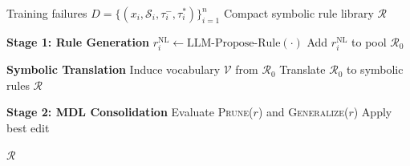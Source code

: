 \begin{algorithm}[h]
\caption{\shortname}
\label{alg:mdlrule}
\small
\begin{algorithmic}[1]
\Require Training failures $D = \{(x_i, \mathcal{S}_i, \tau_i^-, \tau_i^*)\}_{i=1}^n$
\Ensure Compact symbolic rule library $\mathcal{R}$

\Statex \textbf{Stage 1: Rule Generation}
    \State $r_i^{\text{NL}} \gets \text{LLM-Propose-Rule}(\cdot)$
        \State Add $r_i^{\text{NL}}$ to pool $\mathcal{R}_0$
    \EndIf
\EndFor

\Statex \textbf{Symbolic Translation}
\State Induce vocabulary $\mathcal{V}$ from $\mathcal{R}_0$
\State Translate $\mathcal{R}_0$ to symbolic rules $\mathcal{R}$

\Statex \textbf{Stage 2: MDL Consolidation}
\Repeat
        \State Evaluate \textsc{Prune}($r$) and \textsc{Generalize}($r$)
            \State Apply best edit
        \EndIf
    \EndFor
{}

\State \Return $\mathcal{R}$
\end{algorithmic}
\end{algorithm}
